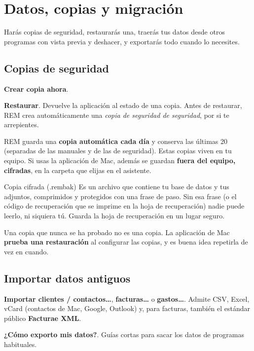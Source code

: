 \chapter{Datos, copias y migración}\label{cap:datos}

\begin{objbox}
Harás copias de seguridad, restaurarás una, traerás tus datos desde otros programas con vista previa y deshacer, y exportarás todo cuando lo necesites.
\end{objbox}


\section{Copias de seguridad}
\begin{leyenda}
\item[\mk{1}] \textbf{Crear copia ahora}.
\item[\mk{2}] \textbf{Restaurar}. Devuelve la aplicación al estado de una copia. Antes de restaurar, REM crea automáticamente una \emph{copia de seguridad de seguridad}, por si te arrepientes.
\end{leyenda}
REM guarda una \textbf{copia automática cada día} y conserva las últimas 20 (separadas de las manuales y de las de seguridad). Estas copias viven en tu equipo. Si usas la aplicación de Mac, además se guardan \textbf{fuera del equipo, cifradas}, en la carpeta que elijas en el asistente.

\begin{plainbox}{Copia cifrada (.rembak)}
Es un archivo que contiene tu base de datos y tus adjuntos, comprimidos y protegidos con una frase de paso. Sin esa frase (o el código de recuperación que se imprime en la hoja de recuperación) nadie puede leerlo, ni siquiera tú. Guarda la hoja de recuperación en un lugar seguro.
\end{plainbox}

\begin{warnbox}
Una copia que nunca se ha probado no es una copia. La aplicación de Mac \textbf{prueba una restauración} al configurar las copias, y es buena idea repetirla de vez en cuando.
\end{warnbox}

\section{Importar datos antiguos}
\begin{leyenda}
\item[\mk{3}] \textbf{Importar clientes / contactos…}, \textbf{facturas…} o \textbf{gastos…}. Admite CSV, Excel, vCard (contactos de Mac, Google, Outlook) y, para facturas, también el estándar público \textbf{Facturae XML}.
\item[\mk{4}] \textbf{¿Cómo exporto mis datos?}. Guías cortas para sacar los datos de programas habituales.
\end{leyenda}

